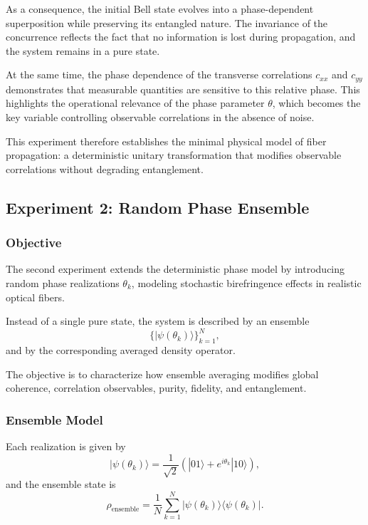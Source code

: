 \documentclass[a4paper]{article}
\begin{document}
As a consequence, the initial Bell state evolves into a phase-dependent superposition while preserving its entangled nature. The invariance of the concurrence reflects the fact that no information is lost during propagation, and the system remains in a pure state.

At the same time, the phase dependence of the transverse correlations \(c_{xx}\) and \(c_{yy}\) demonstrates that measurable quantities are sensitive to this relative phase. This highlights the operational relevance of the phase parameter \(\theta\), which becomes the key variable controlling observable correlations in the absence of noise.

This experiment therefore establishes the minimal physical model of fiber propagation: a deterministic unitary transformation that modifies observable correlations without degrading entanglement.

\subsection{Experiment 2: Random Phase Ensemble}

\subsubsection{Objective}

The second experiment extends the deterministic phase model by introducing random phase realizations \(\theta_k\), modeling stochastic birefringence effects in realistic optical fibers.

Instead of a single pure state, the system is described by an ensemble
\[
\{ |\psi(\theta_k)\rangle \}_{k=1}^{N},
\]
and by the corresponding averaged density operator.

The objective is to characterize how ensemble averaging modifies global coherence, correlation observables, purity, fidelity, and entanglement.

\subsubsection{Ensemble Model}

Each realization is given by
\[
|\psi(\theta_k)\rangle
=
\frac{1}{\sqrt{2}}
\left(
|01\rangle + e^{i\theta_k}|10\rangle
\right),
\]
and the ensemble state is
\[
\rho_{\mathrm{ensemble}}
=
\frac{1}{N}
\sum_{k=1}^{N}
|\psi(\theta_k)\rangle\langle \psi(\theta_k)|.
\]
\end{document}
